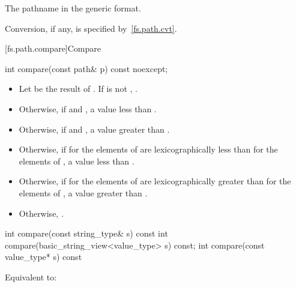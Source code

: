 \begin{itemdescr}
\pnum
\returns The pathname in the generic format.

\pnum
\remarks Conversion, if any, is specified by~\ref{fs.path.cvt}.
\end{itemdescr}

[fs.path.compare]{Compare}

%
\begin{itemdecl}
int compare(const path& p) const noexcept;
\end{itemdecl}

\begin{itemdescr}
\pnum
\returns
\begin{itemize}
\item
  Let  be the result of
  .
  If  is not ,
  .
\item
  Otherwise, if
   and ,
  a value less than .
\item
  Otherwise, if
   and ,
  a value greater than .
\item
  Otherwise, if
   for the elements of 
  are lexicographically less than
   for the elements of ,
  a value less than .
\item
  Otherwise, if
   for the elements of 
  are lexicographically greater than
   for the elements of ,
  a value greater than .
\item
  Otherwise, .
\end{itemize}
\end{itemdescr}

%
\begin{itemdecl}
int compare(const string_type& s) const
int compare(basic_string_view<value_type> s) const;
int compare(const value_type* s) const
\end{itemdecl}

\begin{itemdescr}
\pnum
\effects Equivalent to: 
\end{itemdescr}


